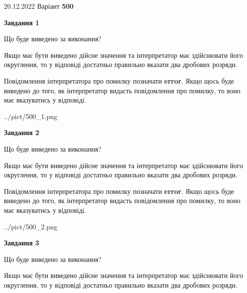 \documentclass[12pt, ukrainian]{article}
\begin{document}
{20.12.2022 Варіант \No \textbf { 500 }\par}
{
\begin {Large}

{\begin {center}\textbf{Завдання 1}\end {center}}\par
Що буде виведено за виконання? \par

Якщо має бути виведено дійсне значення та інтерпретатор має здійснювати його округлення, 
то у відповіді достатньо правильно вказати два дробових розряди.

Повідомлення інтерпретатора про помилку позначати \textbf{error}.
Якщо щось буде виведено до того, як інтерпретатор видасть повідомлення про помилку, 
то воно має вказуватись у відповіді. \par

\begin{center}
	{../pict/500_1.png}
\end{center}
\newpage

{\begin {center}\textbf{Завдання 2}\end {center}}\par
Що буде виведено за виконання? \par

Якщо має бути виведено дійсне значення та інтерпретатор має здійснювати його округлення, 
то у відповіді достатньо правильно вказати два дробових розряди.

Повідомлення інтерпретатора про помилку позначати \textbf{error}.
Якщо щось буде виведено до того, як інтерпретатор видасть повідомлення про помилку, 
то воно має вказуватись у відповіді. \par

\begin{center}
	{../pict/500_2.png}
\end{center}
\newpage

{\begin {center}\textbf{Завдання 3}\end {center}}\par
Що буде виведено за виконання? \par

Якщо має бути виведено дійсне значення та інтерпретатор має здійснювати його округлення, 
то у відповіді достатньо правильно вказати два дробових розряди.


\end{Large}}
\end{document}

